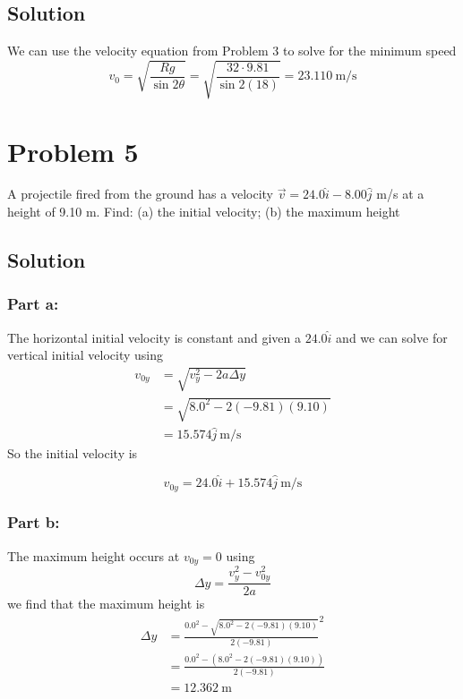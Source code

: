 \documentclass{article}
\begin{document}
\subsection*{Solution}
We can use the velocity equation from Problem 3 to solve for the minimum speed
\[
	v_0 = \sqrt{\frac{Rg}{\sin 2\theta}} = \sqrt{\frac{32\cdot 9.81}{\sin 2(18)}} = \boxed{23.110\ \text{m/s}}
\]

\section*{Problem 5}
A projectile fired from the ground has a velocity $\vec{v} = 24.0 \hat i - 8.00 \hat j$ m/s at a height of
9.10 m. Find: (a) the initial velocity; (b) the maximum height

\subsection*{Solution}
\subsubsection*{Part a:}
The horizontal initial velocity is constant and given a $24.0 \hat i$ and we can solve for vertical initial velocity using
\begin{align*}
	v_{0y} &= \sqrt{v_y^2 - 2a \Delta y} \\
	       &= \sqrt{8.0^2 - 2(-9.81)(9.10)} \\
	       &= 15.574 \hat j\ \text{m/s}
\end{align*}
So the initial velocity is

\[
	\boxed{v_{0y} = 24.0 \hat i + 15.574 \hat j\ \text{m/s}}
\]

\subsubsection*{Part b:}
The maximum height occurs at $v_{0y} = 0$ using
\begin{equation}
	\Delta y = \frac{v_y^2 - v_{0y}^2}{2a}
\end{equation}
we find that the maximum height is
\begin{align*}
	\Delta y &= \frac{0.0^2 - \sqrt{8.0^2 - 2(-9.81)(9.10)}}{2(-9.81)}^2 \\
		 &= \frac{0.0^2 - \left(8.0^2 - 2(-9.81)(9.10)\right)}{2(-9.81)} \\
		 &= \boxed{12.362\ \text{m}}
\end{align*}
\end{document}
